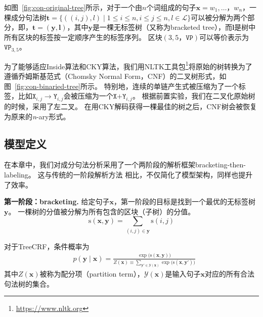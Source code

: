 如图~\ref{fig:con-original-tree}所示，对于一个由$n$个词组成的句子$\boldsymbol{x}=w_1,\dots，w_{n}$，一棵成分句法树$\boldsymbol{t}=\{((i, j),l)\mid 1\le i \le n,i \le j \le n,l \in \mathcal{L}\}$可以被分解为两个部分，即，$\boldsymbol{t}=(\boldsymbol{y}, \boldsymbol{l})$，其中$\boldsymbol{y}$是一棵无标签树（又称为bracketed tree），而$\boldsymbol{l}$是树中所有区块的标签按一定顺序产生的标签序列。
区块$(3,5，\texttt{VP})$可以等价表示为$\texttt{VP}_{3,5}$。

为了能够适应Inside算法和CKY算法，我们用NLTK工具包\footnote{\url{https://www.nltk.org}}将原始的树转换为了遵循乔姆斯基范式（Chomsky Normal Form，CNF）的二叉树形式，如图~\ref{fig:con-binaried-tree}所示。
特别地，连续的单链产生式被压缩为了一个标签，比如$\texttt{X}_{i,j} \rightarrow \texttt{Y}_{i,j}$会被压缩为一个$\texttt{X+Y}_{i,j}$。
根据前置实验，我们在二叉化原始树的时候，采用了左二叉。
在用CKY解码获得一棵最佳的树之后，CNF树会被恢复为原来的\textit{n}-ary形式。

\subsection{模型定义}\label{sub@sec:con-crf-model-definition}

在本章中，我们对成分句法分析采用了一个两阶段的解析框架bracketing-then-labeling。
这与传统的一阶段解析方法 \citep{stern-etal-2017-minimal,gaddy-etal-2018-whats}相比，不仅简化了模型架构，同样也提升了效率。

\noindent\textbf{第一阶段：bracketing.}
给定句子$\boldsymbol{x}$，第一阶段的目标是找到一个最优的无标签树$\boldsymbol{y}$。
一棵树的分值被分解为所有包含的区块（子树）的分值。
\begin{equation} \label{eq:tree-score}
	\mathrm{s}(\boldsymbol{x},\boldsymbol{y}) = \sum\limits_{(i,j)\in \boldsymbol{y}}\mathrm{s}(i,j)
\end{equation}

对于TreeCRF，条件概率为
\begin{equation}\label{eq:tree-prob}
	\begin{split}
		& p(\boldsymbol{y}\mid\boldsymbol{x})  = \frac{\exp({\mathrm{s}(\boldsymbol{x},\boldsymbol{y}))}}{Z(\boldsymbol{x}) \equiv \sum\limits_{\boldsymbol{y'} \in \mathcal{Y}(\boldsymbol{x})} {\exp({\mathrm{s}(\boldsymbol{x},\boldsymbol{y'}))}}}
	\end{split}
\end{equation}
其中$Z(\boldsymbol{x})$被称为配分项（partition term），$\mathcal{Y}(\boldsymbol{x})$是输入句子$\boldsymbol{x}$对应的所有合法句法树的集合。

